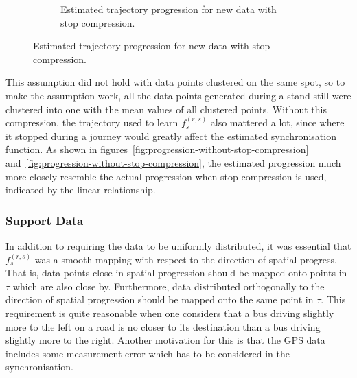 \begin{figure}[H]
\begin{subfigure}[b]{0.5\textwidth}
    \caption{Estimated trajectory progression for new data with stop compression.}
    \label{fig:progression-with-stop-compression}
  \end{subfigure}
\end{figure}
\noindent
This assumption did not hold with data points clustered on the same spot, so to make the assumption work, all the data points generated during a stand-still were clustered into one with the mean values of all clustered points. Without this compression, the trajectory used to learn $f^{(r,s)}_s$ also mattered a lot, since where it stopped during a journey would greatly affect the estimated synchronisation function. As shown in figures~\ref{fig:progression-without-stop-compression} and~\ref{fig:progression-without-stop-compression}, the estimated progression much more closely resemble the actual progression when stop compression is used, indicated by the linear relationship.

\subsubsection{Support Data}
In addition to requiring the data to be uniformly distributed, it was essential that $f^{(r,s)}_s$ was a smooth mapping with respect to the direction of spatial progress. That is, data points close in spatial progression should be mapped onto points in $\tau$ which are also close by. Furthermore, data distributed orthogonally to the direction of spatial progression should be mapped onto the same point in $\tau$. This requirement is quite reasonable when one considers that a bus driving slightly more to the left on a road is no closer to its destination than a bus driving slightly more to the right. Another motivation for this is that the GPS data includes some measurement error which has to be considered in the synchronisation.

